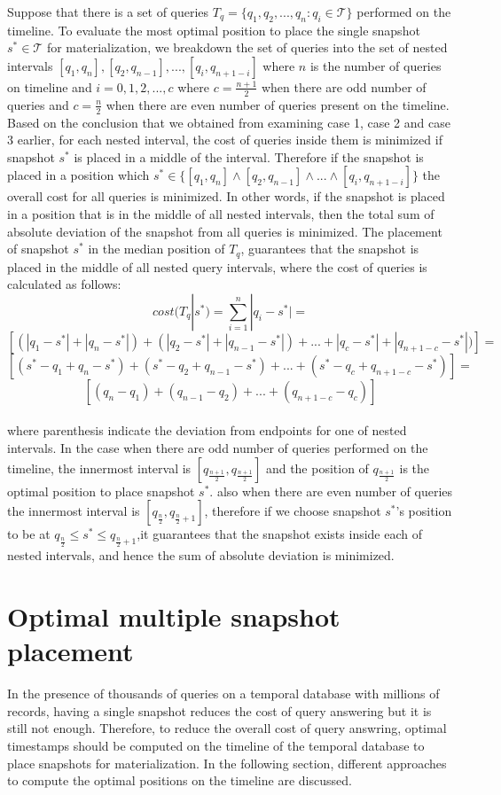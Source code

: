 Suppose that there is a set of queries $T_q=\{q_1,q_2,...,q_n:q_i \in \mathcal{T}\}$ performed on the timeline. To evaluate the most optimal position to place the single snapshot $s^* \in \mathcal{T}$ for materialization, we breakdown the set of queries into the set of nested intervals $[q_1,q_n],[q_2,q_{n-1}],...,[q_i,q_{n+1-i}]$ where $n$ is the number of queries on timeline and $i=0,1,2,...,c$ where $c=\frac{n+1}{2}$ when there are odd number of queries and $c=\frac{n}{2}$ when there are even number of queries present on the timeline.\\ 
Based on the conclusion that we obtained from examining case 1, case 2 and case 3 earlier, for each nested interval, the cost of queries inside them is minimized if snapshot $s^*$ is placed in a middle of the interval. Therefore if the snapshot is placed in a position which $s^*\in \{ [q_1,q_n] \wedge [q_2,q_{n-1}] \wedge ... \wedge [q_i,q_{n+1-i}] \}$ the overall cost for all queries is minimized. In other words, if the snapshot is placed in a position that is in the middle of all nested intervals, then the total sum of absolute deviation of the snapshot from all queries is minimized. The placement of snapshot $s^*$ in the median position of $T_q$, guarantees that the snapshot is placed in the middle of all nested query intervals, where the cost of queries is calculated as follows:
$$cost(T_q|s^*)=\sum_{i=1}^n |q_i-s^*| = $$
$$[(|q_1-s^*|+|q_n-s^*|)+(|q_2-s^*|+|q_{n-1}-s^*|)+...+|q_c-s^*|+|q_{n+1-c}-s^*|)]=$$
$$[(s^*-q_1+q_n-s^*)+(s^*-q_2+q_{n-1}-s^*)+...+(s^*-q_c+q_{n+1-c}-s^*)]=$$
$$[(q_n-q_1)+(q_{n-1}-q_2)+...+(q_{n+1-c}-q_c)]$$\\
where parenthesis indicate the deviation from endpoints for one of nested intervals. In the case when there are odd number of queries performed on the timeline, the innermost interval is $[q_{\frac{n+1}{2}},q_{\frac{n+1}{2}}]$ and the position of $q_{\frac{n+1}{2}}$ is the optimal position to place snapshot $s^*$. also when there are even number of queries the innermost interval is $[q_{\frac{n}{2}},q_{\frac{n}{2}+1}]$, therefore if we choose snapshot $s^*$'s position to be at $q_{\frac{n}{2}}\leq s^*\leq q_{\frac{n}{2}+1}$,it guarantees that the snapshot exists inside each of nested intervals, and hence the sum of absolute deviation is minimized. \\

\section{Optimal multiple snapshot placement}
In the presence of thousands of queries on a temporal database with millions of records, having a single snapshot reduces the cost of query answering but it is still not enough. Therefore, to reduce the overall cost of query answring, optimal timestamps should be computed on the timeline of the temporal database to place snapshots for materialization. In the following section, different approaches to compute the optimal positions on the timeline are discussed.

